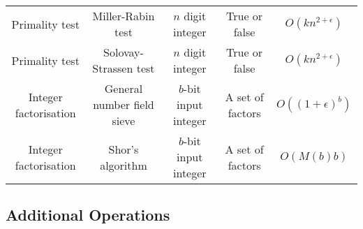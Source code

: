 \documentclass{article}
\begin{document}
\begin{table}[ht]
\begin{tabular}{c cccc}
		Primality test & Miller-Rabin test\footnotemark[5] \footnotemark[6] & $n$ digit integer & True or false & $O(kn^{2+\epsilon})$ \\
		Primality test & Solovay-Strassen test\footnotemark[5] \footnotemark[6] & $n$ digit integer & True or false & $O(kn^{2+\epsilon})$ \\
		Integer factorisation & General number field sieve\footnotemark[5] & $b$-bit input integer & A set of factors & $O((1+\epsilon)^b)$ \\
		Integer factorisation & Shor's algorithm \footnotemark[4] \footnotemark[7] & $b$-bit input integer & A set of factors & $O(M(b)b)$ \\
		\hline
	\end{tabular}
\end{table}


\newpage
\subsection*{Additional Operations}
\end{document}
